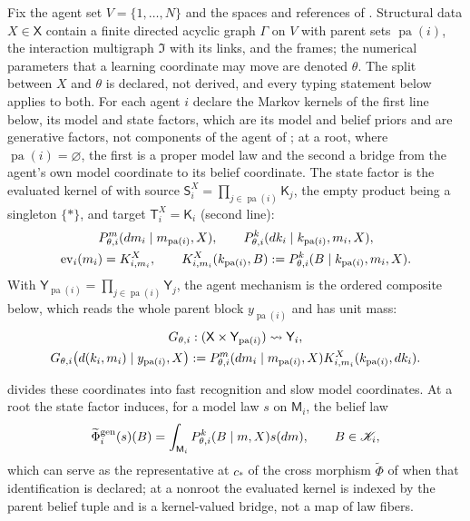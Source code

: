 Fix the agent set $V=\{1,\ldots,N\}$ and the spaces and references of . Structural
data $X\in\mathsf X$ contain a finite directed acyclic graph $\Gamma$ on $V$ with parent sets
$\operatorname{pa}(i)$, the interaction multigraph $\mathfrak I$ with its links, and the frames; the
numerical parameters that a learning coordinate may move are denoted $\theta$. The split between $X$
and $\theta$ is declared, not derived, and every typing statement below applies to both. For each agent
$i$ declare the Markov kernels of the first line below, its model and state factors, which are its model
and belief priors and are generative factors, not components of the agent of ; at a
root, where $\operatorname{pa}(i)=\varnothing$, the first is a proper model law and the second a bridge
from the agent's own model coordinate to its belief coordinate. The state factor is the evaluated
kernel of  with source
$\mathsf S_i^X=\prod_{j\in\operatorname{pa}(i)}\mathsf K_j$, the empty product being a singleton
$\{\ast\}$, and target $\mathsf T_i^X=\mathsf K_i$ (second line):
\begin{gather}
P_{\theta,i}^{m}(dm_i\mid m_{\operatorname{pa}(i)},X),
\qquad
P_{\theta,i}^{k}(dk_i\mid k_{\operatorname{pa}(i)},m_i,X),
\label{eq:gen-kernels}\\
\operatorname{ev}_i(m_i)=K^X_{i,m_i},
\qquad
K^X_{i,m_i}(k_{\operatorname{pa}(i)},B):=P_{\theta,i}^{k}(B\mid k_{\operatorname{pa}(i)},m_i,X).
\label{eq:gen-evaluated-state-kernel}
\end{gather}
With $\mathsf Y_{\operatorname{pa}(i)}=\prod_{j\in\operatorname{pa}(i)}\mathsf Y_j$, the agent mechanism is the
ordered composite below, which reads the whole parent block $y_{\operatorname{pa}(i)}$ and has unit mass:
\begin{gather}
G_{\theta,i}:(\mathsf X\times\mathsf Y_{\operatorname{pa}(i)})\rightsquigarrow\mathsf Y_i,
\label{eq:gen-agent-design-mechanism}\\
G_{\theta,i}\bigl(d(k_i,m_i)\mid y_{\operatorname{pa}(i)},X\bigr)
:=P_{\theta,i}^{m}(dm_i\mid m_{\operatorname{pa}(i)},X)K^X_{i,m_i}(k_{\operatorname{pa}(i)},dk_i).
\label{eq:gen-agent-mechanism}
\end{gather}

 divides these coordinates into fast recognition and slow model
coordinates. At a root the state factor induces, for a model law $s$ on
$\mathsf M_i$, the belief law
\begin{equation}
\widetilde\Phi^{\mathrm{gen}}_i(s)(B)=\int_{\mathsf M_i}P_{\theta,i}^{k}(B\mid m,X)s(dm),
\qquad B\in\mathscr K_i,
\label{eq:gen-root-law-bridge}
\end{equation}
which can serve as the representative at $c_*$ of the cross morphism $\widetilde\Phi$ of
 when that identification is declared; at a nonroot the evaluated kernel
is indexed by the parent belief tuple and is a kernel-valued bridge, not a map of law fibers.

